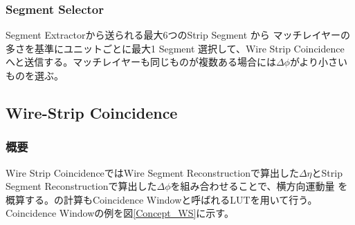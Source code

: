 \subsubsection*{Segment Selector}
Segment Extractorから送られる最大6つのStrip Segment から マッチレイヤーの多さを基準にユニットごとに最大1 Segment 選択して、Wire Strip Coincidence へと送信する。マッチレイヤーも同じものが複数ある場合には$\Delta\phi$がより小さいものを選ぶ。

\subsection{Wire-Strip Coincidence}
\subsubsection*{概要}
Wire Strip CoincidenceではWire Segment Reconstructionで算出した$\Delta\eta$とStrip Segment Reconstructionで算出した$\Delta\phi$を組み合わせることで、横方向運動量 \pt を概算する。\pt の計算もCoincidence Windowと呼ばれるLUTを用いて行う。Coincidence Windowの例を図\ref{Concept_WS}に示す。

